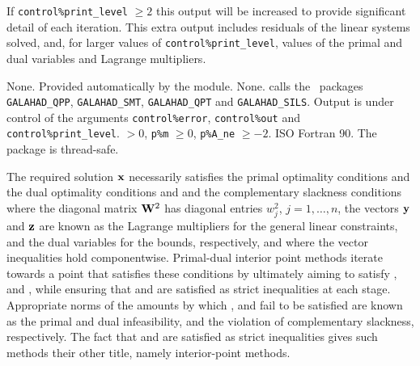 \documentclass{galahad}
\newcommand{\packagename}{CLS}
\begin{document}
If {\tt control\%print\_level} $\geq 2$ this 
output will be increased to provide significant detail of each iteration. 
This extra output includes residuals of the linear systems solved, and,
for larger values of {\tt control\%print\_level}, values of the primal and dual
variables and Lagrange multipliers. 


\galgeneral

\galcommon None.
\galworkspace Provided automatically by the module.
\galroutines None. 
\galmodules {\tt \packagename\_solve} calls the \galahad\ packages
{\tt GALAHAD\_QPP}, 
{\tt GALAHAD\_SMT}, \sloppy
{\tt GALAHAD\_QPT} and 
{\tt GALAHAD\_SILS}.
\galio Output is under control of the arguments
 {\tt control\%error}, {\tt control\%out} and {\tt control\%print\_level}.
 $> 0$, 
{\tt p\%m} $\geq  0$, {\tt p\%A\_ne} $\geq -2$.
\galportability ISO Fortran 90. The package is thread-safe.


\galmethod
The required solution ${\mathbf{x}}$ necessarily satisfies 
the primal optimality conditions
and 
the dual optimality conditions
and 
and the complementary slackness conditions 
where the diagonal matrix ${\mathbf{W}}^{2}$ has diagonal entries $w_{j}^{2}$,
$j = 1, \ldots ,n$, the vectors ${\mathbf{y}}$ and ${\mathbf{z}}$ are 
known as the Lagrange multipliers for
the general linear constraints, and the dual variables for the bounds,
respectively, and where the vector inequalities hold componentwise.
Primal-dual interior point methods iterate towards a point
that satisfies these conditions by ultimately aiming to satisfy
,  and , while ensuring that 
 and  are 
satisfied as strict inequalities at each stage. 
Appropriate norms of the amounts by 
which ,  and  fail to be satisfied are known as the
primal and dual infeasibility, and the violation of complementary slackness,
respectively. The fact that  and  are satisfied as strict 
inequalities gives such methods their other title, namely 
interior-point methods.
\end{document}

